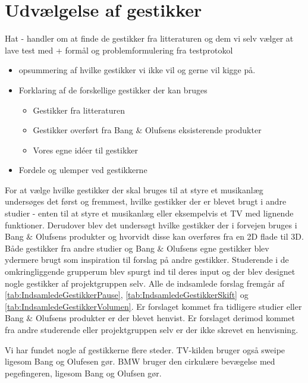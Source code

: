 \section{Udvælgelse af gestikker}
\label{UdvaelgelseAfGestikker}
%
Hat - handler om at finde de gestikker fra litteraturen og dem vi selv vælger at lave test med + formål og problemformulering fra testprotokol
%

\begin{itemize}
  \item opsummering af hvilke gestikker vi ikke vil og gerne vil kigge på.
  \item Forklaring af de forskellige gestikker der kan bruges
  \begin{itemize}
  	\item Gestikker fra litteraturen
  	\item Gestikker overført fra Bang $\&$ Olufsens eksisterende produkter
  	\item Vores egne idéer til gestikker
  \end{itemize}
  \item Fordele og ulemper ved gestikkerne
\end{itemize}

For at vælge hvilke gestikker der skal bruges til at styre et musikanlæg undersøges det først og fremmest, hvilke gestikker der er blevet brugt i andre studier - enten til at styre et musikanlæg eller eksempelvis et TV med lignende funktioner. Derudover blev det undersøgt hvilke gestikker der i forvejen bruges i Bang $\&$ Olufsens produkter og hvorvidt disse kan overføres fra en 2D flade til 3D. Både gestikker fra andre studier og Bang $\&$ Olufsens egne gestikker blev ydermere brugt som inspiration til forslag på andre gestikker. Studerende i de omkringliggende grupperum blev spurgt ind til deres input og der blev designet nogle gestikker af projektgruppen selv. Alle de indsamlede forslag fremgår af \autoref{tab:IndsamledeGestikkerPause}, \autoref{tab:IndsamledeGestikkerSkift} og \autoref{tab:IndsamledeGestikkerVolumen}. Er forslaget kommet fra tidligere studier eller Bang $\&$ Olufsens produkter er der blevet henvist. Er forslaget derimod kommet fra andre studerende eller projektgruppen selv er der ikke skrevet en henvisning. 

Vi har fundet nogle af gestikkerne flere steder. TV-kilden bruger også sweipe ligesom Bang og Olufesen gør. BMW bruger den cirkulære bevægelse med pegefingeren, ligesom Bang og Olufsen gør. 


